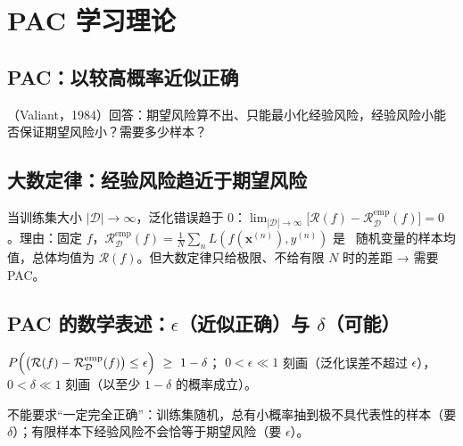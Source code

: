 \section{PAC 学习理论}

\subsection{PAC：以较高概率近似正确}
（Valiant，1984）回答：期望风险算不出、只能最小化经验风险，经验风险小能否保证期望风险小？需要多少样本？

\subsection{大数定律：经验风险趋近于期望风险}
当训练集大小 $|\mathcal D|\to\infty$，泛化错误趋于 0：$\lim_{|\mathcal D|\to\infty}\bigl[\mathcal R(f)-\mathcal R^{\mathrm{emp}}_{\mathcal D}(f)\bigr]=0$。理由：固定 $f$，$\mathcal R^{\mathrm{emp}}_{\mathcal D}(f)=\frac1N\sum_n L(f(\bm x^{(n)}),y^{(n)})$ 是 \iid\ 随机变量的样本均值，总体均值为 $\mathcal R(f)$。但大数定律只给极限、不给有限 $N$ 时的差距 → 需要 PAC。

\subsection{PAC 的数学表述：\texorpdfstring{$\epsilon$}{epsilon}（近似正确）与 \texorpdfstring{$\delta$}{delta}（可能）}
\begin{defn}[PAC 学习]
$P\Bigl(\bigl(\mathcal R(f)-\mathcal R^{\mathrm{emp}}_{\mathcal D}(f)\bigr)\le\epsilon\Bigr)\ \ge\ 1-\delta$；
$0<\epsilon\ll1$ 刻画（泛化误差不超过 $\epsilon$），$0<\delta\ll1$ 刻画（以至少 $1-\delta$ 的概率成立）。
\end{defn}
不能要求“一定完全正确”：训练集随机，总有小概率抽到极不具代表性的样本（要 $\delta$）；有限样本下经验风险不会恰等于期望风险（要 $\epsilon$）。

